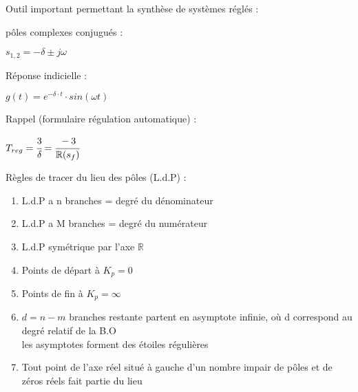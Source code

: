 
\hformbar
{}

\footnotesize Outil important permettant la synthèse de systèmes réglés : 

pôles complexes conjugués :

{\hfill $s_{1,2} = -\delta \pm j\omega $\hfill}

Réponse indicielle :

{\hfill $g(t) = e^{-\delta \cdot t} \cdot sin(\omega t) $\hfill}

Rappel (formulaire régulation automatique) : 

{\hfill $T_{reg} = \cfrac{3}{\delta} = \cfrac{-3}{\mathbb{R}(s_f)}$\hfill}\vspace{3mm}

Règles de tracer du lieu des pôles (L.d.P) :
\begin{enumerate}
    \item L.d.P a n branches = degré du dénominateur 
    \item L.d.P a M branches = degré du numérateur
    \item L.d.P symétrique par l'axe $\mathbb{R}$
    \item Points de départ à $K_p = 0$
    \item Points de fin à $K_p = \infty$
    \item $d = n-m$ branches restante partent en asymptote infinie, où d correspond au degré relatif de la B.O\\ les asymptotes forment des étoiles régulières
    \item Tout point de l'axe réel situé à gauche d'un nombre impair de pôles et de zéros réels fait partie du lieu
\end{enumerate}



\hformbar

